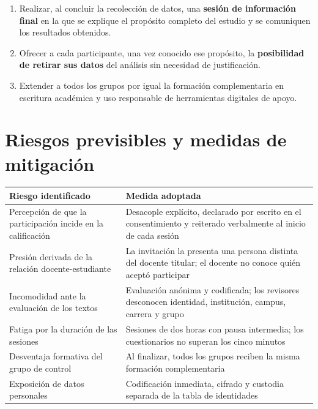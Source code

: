 \documentclass[11pt,a4paper]{article}
\begin{document}
\begin{enumerate}[label=\textbf{\alph*)},leftmargin=1.0cm]
	\item Realizar, al concluir la recolecci\'on de datos, una \textbf{sesi\'on de informaci\'on final} en la que se explique el prop\'osito completo del estudio y se comuniquen los resultados obtenidos.
	\item Ofrecer a cada participante, una vez conocido ese prop\'osito, la \textbf{posibilidad de retirar sus datos} del an\'alisis sin necesidad de justificaci\'on.
	\item Extender a todos los grupos por igual la formaci\'on complementaria en escritura acad\'emica y uso responsable de herramientas digitales de apoyo.
\end{enumerate}

\section{Riesgos previsibles y medidas de mitigaci\'on}

\begin{table}[htbp]
	\centering
	\small
	\begin{tabular}{L{6.5cm} L{8.2cm}}
		\toprule
		\textbf{Riesgo identificado} & \textbf{Medida adoptada} \\
		\midrule
		Percepci\'on de que la participaci\'on incide en la calificaci\'on & Desacople expl\'icito, declarado por escrito en el consentimiento y reiterado verbalmente al inicio de cada sesi\'on \\
		Presi\'on derivada de la relaci\'on docente-estudiante & La invitaci\'on la presenta una persona distinta del docente titular; el docente no conoce qui\'en acept\'o participar \\
		Incomodidad ante la evaluaci\'on de los textos & Evaluaci\'on an\'onima y codificada; los revisores desconocen identidad, instituci\'on, campus, carrera y grupo \\
		Fatiga por la duraci\'on de las sesiones & Sesiones de dos horas con pausa intermedia; los cuestionarios no superan los cinco minutos \\
		Desventaja formativa del grupo de control & Al finalizar, todos los grupos reciben la misma formaci\'on complementaria \\
		Exposici\'on de datos personales & Codificaci\'on inmediata, cifrado y custodia separada de la tabla de identidades \\
		\bottomrule
	\end{tabular}
\end{table}
\end{document}

